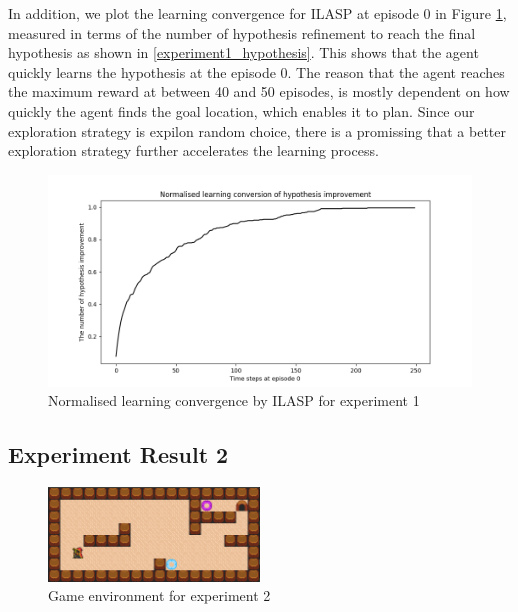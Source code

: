 In addition, we plot the learning convergence for ILASP at episode 0 in Figure \ref{experiment1_ilasp}, measured in terms of the number of hypothesis refinement to reach the final hypothesis as shown in \ref{experiment1_hypothesis}.
This shows that the agent quickly learns the hypothesis at the episode 0. The reason that the agent reaches the maximum reward at between 40 and 50 episodes, is mostly dependent on how quickly the agent finds the goal location,
which enables it to plan. Since our exploration strategy is expilon random choice, there is a promissing that a better exploration strategy further accelerates the learning process.

\begin{figure}[!htb]
\centering
\includegraphics[width=1.0\textwidth]{./figures/experiment1_ilasp}
\caption{Normalised learning convergence by ILASP for experiment 1}
\label{experiment1_ilasp}
\end{figure}

\newpage
\subsection{Experiment Result 2}
\label{subsec:experiment_result_2}

\begin{figure}[!htb]
\centering
\includegraphics[width=0.5\textwidth]{./figures/experiment2}
\caption{Game environment for experiment 2}
\label{experiment3}
\end{figure}

